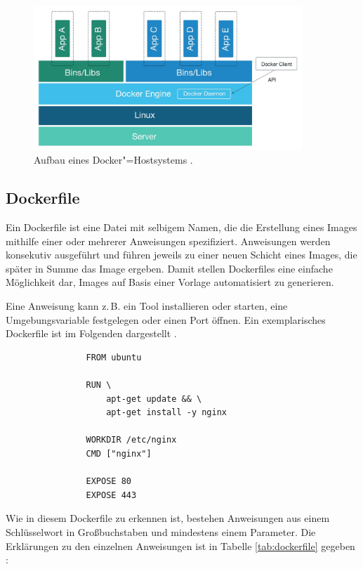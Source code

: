 \documentclass[../main.tex]{subfiles}
\begin{document}
      \begin{figure}[h]
          \centering
          \includegraphics[width=0.9\textwidth]{./images/intro_dockerHost.jpg}
          \caption{Aufbau eines Docker"=Hostsystems \cite[S.3]{dockerSecIntro}.}
          \label{fig:intro_dockerHost}
      \end{figure}

		\subsection{Dockerfile}
		\label{dockerDockerfile}
      Ein Dockerfile ist eine Datei mit selbigem Namen, die die Erstellung eines Images mithilfe einer oder mehrerer Anweisungen spezifiziert. Anweisungen werden konsekutiv ausgeführt und führen jeweils zu einer neuen Schicht eines Images, die später in Summe das Image ergeben. Damit stellen Dockerfiles eine einfache Möglichkeit dar, Images auf Basis einer Vorlage automatisiert zu generieren.

			Eine Anweisung kann z.\,B. ein Tool installieren oder starten, eine Umgebungsvariable festgelegen oder einen Port öffnen. Ein exemplarisches Dockerfile ist im Folgenden dargestellt \cite{githubDockerfileNginx}.

			\begin{lstlisting}
				FROM ubuntu

				RUN \
					apt-get update && \
					apt-get install -y nginx

				WORKDIR /etc/nginx
				CMD ["nginx"]

				EXPOSE 80
				EXPOSE 443
			\end{lstlisting}

			Wie in diesem Dockerfile zu erkennen ist, bestehen Anweisungen aus einem Schlüsselwort in Großbuchstaben und mindestens einem Parameter. Die Erklärungen zu den einzelnen Anweisungen ist in Tabelle \ref{tab:dockerfile} gegeben \cite{dockerDockerfileDocs}:
\end{document}
